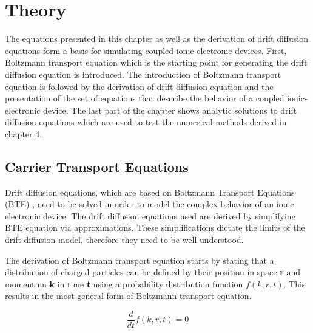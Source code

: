 
\chapter{Theory} %

\label{Chapter2} %

\begin{doublespace}

The equations presented in this chapter as well as the derivation of drift diffusion equations form a basis for simulating coupled ionic-electronic devices. First,  Boltzmann transport equation which is the starting point for generating the drift diffusion equation is introduced. The introduction of  Boltzmann transport equation is followed by the derivation of  drift diffusion equation and the presentation of the set of equations that describe the behavior of a coupled ionic-electronic device. The last part of the chapter shows analytic solutions to  drift diffusion equations which are used to test the numerical methods derived in chapter 4.   

\section{Carrier Transport Equations}
Drift diffusion equations, which are based on Boltzmann Transport Equations (BTE) \cite{Dragica1}, need to be solved in order to model the complex behavior of an ionic electronic device. The drift diffusion equations used are derived by simplifying  BTE equation via approximations. These simplifications dictate the limits of the drift-diffusion model, therefore they need to be well understood.

The derivation of  Boltzmann transport equation starts by stating that a distribution of charged particles can be defined by their position in space \textbf{r} and momentum \textbf{k} in time \textbf{t} using a probability distribution function $f(k,r,t)$. This results in the most general form of  Boltzmann transport equation\cite{snowden}.

\begin{equation}
\frac{d }{dt}f(k,r,t)=0
\end{equation}


\end{doublespace}
